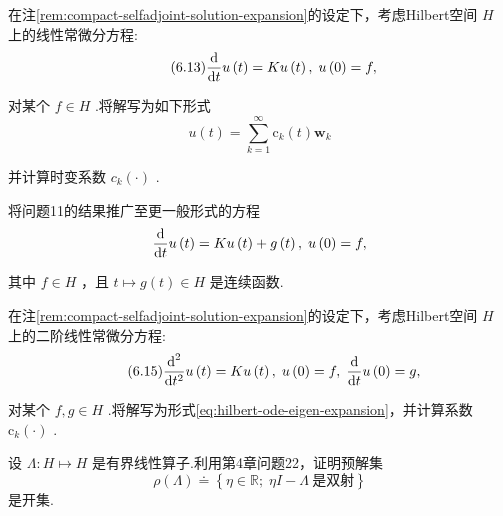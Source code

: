 \begin{rbhw}
在注\ref{rem:compact-selfadjoint-solution-expansion}的设定下，考虑Hilbert空间 $H$ 上的线性常微分方程:
\begin{equation}\tag{6.13}\label{eq:first-order-hilbert-ode}
\frac{\mathop{}\!\mathrm{d}}{\mathop{}\!\mathrm{d} t}u\left( t\right)  = {Ku}\left( t\right) ,\;u\left( 0\right)  = f,
\end{equation}

对某个 $f \in  H$ .将解写为如下形式
\begin{equation}\tag{6.14}\label{eq:hilbert-ode-eigen-expansion}
u\left( t\right)  = \mathop{\sum }\limits_{{k = 1}}^{\infty }{\mathrm{c}}_{k}\left( t\right) {\bm{w}}_{k}
\end{equation}

并计算时变系数 ${c}_{k}\left( \cdot \right)$ .
\end{rbhw}

\begin{rbhw}
将问题11的结果推广至更一般形式的方程
\[
\frac{\mathop{}\!\mathrm{d}}{\mathop{}\!\mathrm{d} t}u\left( t\right)  = {Ku}\left( t\right)  + g\left( t\right) ,\;u\left( 0\right)  = f,
\]

其中 $f \in  H$ ，且 $t \mapsto  g\left( t\right)  \in  H$ 是连续函数.
\end{rbhw}

\begin{rbhw}
在注\ref{rem:compact-selfadjoint-solution-expansion}的设定下，考虑Hilbert空间 $H$ 上的二阶线性常微分方程:
\begin{equation}\tag{6.15}\label{eq:second-order-hilbert-ode}
\frac{{\mathop{}\!\mathrm{d}}^{2}}{\mathop{}\!\mathrm{d}{t}^{2}}u\left( t\right)  = {Ku}\left( t\right) ,\;u\left( 0\right)  = f,\;\frac{\mathop{}\!\mathrm{d}}{\mathop{}\!\mathrm{d} t}u\left( 0\right)  = g,
\end{equation}

对某个 $f,g \in  H$ .将解写为形式\eqref{eq:hilbert-ode-eigen-expansion}，并计算系数 ${\mathrm{c}}_{k}\left( \cdot \right)$ .
\end{rbhw}

\begin{rbhw}
设 $\Lambda  : H \mapsto  H$ 是有界线性算子.利用第4章问题22，证明预解集
\[
\rho \left( \Lambda \right)  \doteq  \left\{ \eta  \in  \mathbb{R};\;{\eta I} - \Lambda\ \text{是双射}\right\}
\]
是开集.
\end{rbhw}
